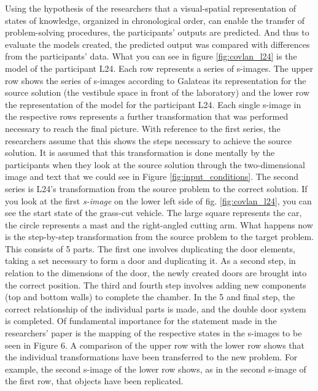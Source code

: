\documentclass[12pt]{article}
\begin{document}
Using the hypothesis of the researchers that a visual-spatial representation of states of knowledge, organized in chronological order, can enable the transfer of problem-solving procedures, the participants' outputs are predicted. And thus to evaluate the models created, the predicted output was compared with differences from the participants' data. What you can see in figure \ref{fig:covlan_l24} is the model of the participant L24. Each row represents a series of s-images. The upper row shows the series of s-images according to Galateas its representation for the source solution (the vestibule space in front of the laboratory) and the lower row the representation of the model for the participant L24. Each single s-image in the respective rows represents a further transformation that was performed necessary to reach the final picture. With reference to the first series, the researchers assume that this shows the steps necessary to achieve the source solution. It is assumed that this transformation is done mentally by the participants when they look at the source solution through the two-dimensional image and text that we could see in Figure \ref{fig:input_conditions}. The second series is L24's transformation from the source problem to the correct solution. If you look at the first \textit{s-image} on the lower left side of fig. \ref{fig:covlan_l24}, you can see the start state of the grass-cut vehicle. The large square represents the car, the circle represents a mast and the right-angled cutting arm. What happens now is the step-by-step transformation from the source problem to the target problem. This consists of 5 parts. The first one involves duplicating the door elements, taking a set necessary to form a door and duplicating it. As a second step, in relation to the dimensions of the door, the newly created doors are brought into the correct position. The third and fourth step involves adding new components (top and bottom walls) to complete the chamber. In the 5 and final step, the correct relationship of the individual parts is made, and the double door system is completed. Of fundamental importance for the statement made in the researchers' paper is the mapping of the respective states in the s-images to be seen in Figure 6. A comparison of the upper row with the lower row shows that the individual transformations have been transferred to the new problem. For example, the second s-image of the lower row shows, as in the second s-image of the first row, that objects have been replicated.
\end{document}
